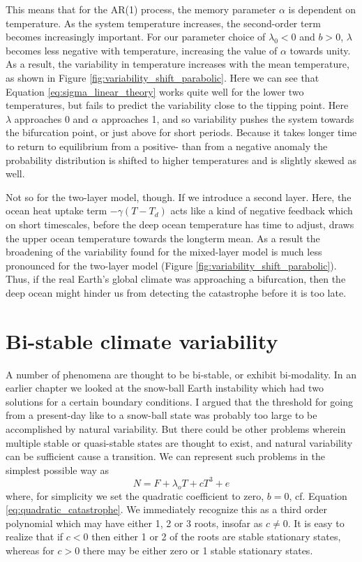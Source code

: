 \documentclass[12pt]{book}
\begin{document}
This means that for the AR(1) process, the memory parameter $\alpha$ is dependent on temperature. As the system temperature increases, the second-order term becomes increasingly important. For our parameter choice of $\lambda_0 < 0$ and $b > 0$, $\lambda$ becomes less negative with temperature, increasing the value of $\alpha$ towards unity.  As a result, the variability in temperature increases with the mean temperature, as shown in Figure \ref{fig:variability_shift_parabolic}. Here we can see that  Equation \ref{eq:sigma_linear_theory} works quite well for the lower two temperatures, but fails to predict the variability close to the tipping point. Here $\lambda$ approaches 0 and $\alpha$ approaches 1, and so variability pushes the system towards the bifurcation point, or just above for short periods. Because it takes longer time to return to equilibrium from a positive- than from a negative anomaly the probability distribution is shifted to higher temperatures and is slightly skewed as well.

Not so for the two-layer model, though. If we introduce a second layer. Here, the ocean heat uptake term $-\gamma (T-T_d)$ acts like a kind of negative feedback which on short timescales, before the deep ocean temperature has time to adjust, draws the upper ocean temperature towards the longterm mean. As a result the broadening of the variability found for the mixed-layer model is much less pronounced for the two-layer model (Figure \ref{fig:variability_shift_parabolic}). Thus, if the real Earth's global climate was approaching a bifurcation, then the deep ocean might hinder us from detecting the catastrophe before it is too late. 

\section{Bi-stable climate variability}
A number of phenomena are thought to be bi-stable, or exhibit bi-modality. In an earlier chapter we looked at the snow-ball Earth instability which had two solutions for a certain boundary conditions. I argued that the threshold for going from a present-day like to a snow-ball state was probably too large to be accomplished by natural variability. But there could be other problems wherein multiple stable or quasi-stable states are thought to exist, and natural variability can be sufficient cause a transition. 
We can represent such problems in the simplest possible way as 
\begin{equation}
N=F+\lambda_o T + c T^3 + e \label{eq:qubic_catastrophe}
\end{equation}
where, for simplicity we set the quadratic coefficient to zero, $b=0$, cf. Equation \ref{eq:quadratic_catastrophe}. We immediately recognize this as a third order polynomial which may have either 1, 2 or 3 roots, insofar as $c \ne 0$. It is easy to realize that if $c<0$ then either 1 or 2 of the roots are stable stationary states, whereas for $c>0$ there may be either zero or 1 stable stationary states. 
\end{document}
